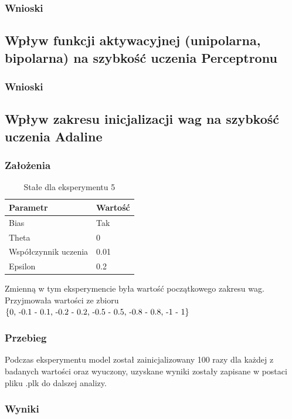 \documentclass{article}
\begin{document}
\subsubsection*{Wnioski}


\newpage
\subsection{Wpływ funkcji aktywacyjnej (unipolarna, bipolarna) na szybkość uczenia Perceptronu}
\subsubsection*{Wnioski}

\newpage
\subsection{Wpływ zakresu inicjalizacji wag na szybkość uczenia Adaline}
\subsubsection*{Założenia}
\begin{table}[h]
	\caption{Stałe dla eksperymentu 5}
	\label{tabela-const-5}
	\centering
	\begin{tabular}{ll}
		\toprule
		Parametr               & Wartość \\
		\midrule
		Bias                   & Tak       \\
		Theta                  & 0         \\
		Współczynnik uczenia & 0.01      \\
		Epsilon                & 0.2       \\
		\bottomrule
	\end{tabular}
\end{table}

Zmienną w tym eksperymencie była wartość początkowego zakresu wag. Przyjmowała wartości ze zbioru \(\{$0, -0.1 - 0.1, -0.2 - 0.2, -0.5 - 0.5, -0.8 - 0.8, -1 - 1$\}\)

\subsubsection*{Przebieg}

Podczas eksperymentu model został zainicjalizowany 100 razy dla każdej z badanych wartości oraz wyuczony, uzyskane wyniki zostały zapisane w postaci pliku .plk do dalszej analizy.
\subsubsection*{Wyniki}
\end{document}
